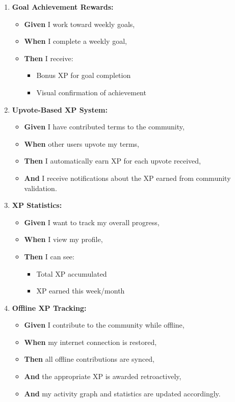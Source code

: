 \documentclass[12pt]{article}
\begin{document}
\begin{enumerate}
    \item \textbf{Goal Achievement Rewards:}
    \begin{itemize}
        \item \textbf{Given} I work toward weekly goals,
        \item \textbf{When} I complete a weekly goal,
        \item \textbf{Then} I receive:
        \begin{itemize}
            \item Bonus XP for goal completion
            \item Visual confirmation of achievement
        \end{itemize}
    \end{itemize}

    \item \textbf{Upvote-Based XP System:}
    \begin{itemize}
        \item \textbf{Given} I have contributed terms to the community,
        \item \textbf{When} other users upvote my terms,
        \item \textbf{Then} I automatically earn XP for each upvote received,
        \item \textbf{And} I receive notifications about the XP earned from community validation.
    \end{itemize}

    \item \textbf{XP Statistics:}
    \begin{itemize}
        \item \textbf{Given} I want to track my overall progress,
        \item \textbf{When} I view my profile,
        \item \textbf{Then} I can see:
        \begin{itemize}
            \item Total XP accumulated
            \item XP earned this week/month
        \end{itemize}
    \end{itemize}

    \item \textbf{Offline XP Tracking:}
    \begin{itemize}
        \item \textbf{Given} I contribute to the community while offline,
        \item \textbf{When} my internet connection is restored,
        \item \textbf{Then} all offline contributions are synced,
        \item \textbf{And} the appropriate XP is awarded retroactively,
        \item \textbf{And} my activity graph and statistics are updated accordingly.
    \end{itemize}
\end{enumerate}
\end{document}
